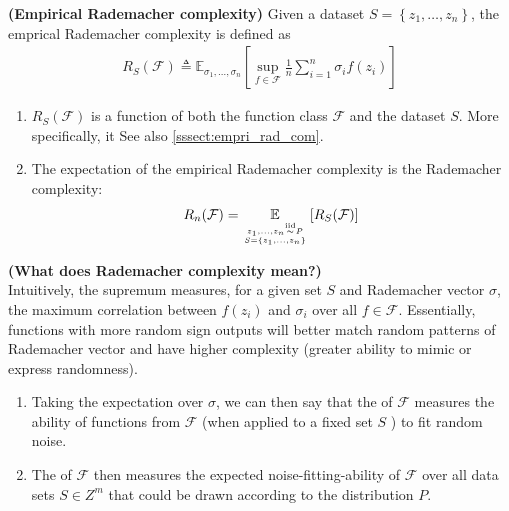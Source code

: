 \documentclass{article}
\newcommand{\bfs}[1]{\textbf{({#1}) }}
\begin{document}
\begin{defa}\bfs{Empirical Rademacher complexity}
 Given a dataset $S=\left\{z_{1}, \ldots, z_{n}\right\}$, the emprical Rademacher complexity is defined as
\begin{align*}
R_{S}(\mathcal{F}) \triangleq \mathbb{E}_{\sigma_{1}, \ldots, \sigma_{n}}\left[\sup _{f \in \mathcal{F}} \frac{1}{n} \sum_{i=1}^{n} \sigma_{i} f\left(z_{i}\right)\right]
\end{align*}
\end{defa}
\begin{rema}\text{ \\}
\begin{enumerate}
    \item $R_{S}(\mathcal{F})$ is a function of both the function class $\mathcal{F}$ and the dataset $S$. More specifically, it   See also \cref{sssect:empri_rad_com}.
    \item The expectation of the empirical Rademacher complexity is the Rademacher complexity:
    $$R_{n}(\mathcal{F})=\underset{z_{1}, \ldots, z_{n} \stackrel{\operatorname{iid}}{\sim} P \atop S=\left\{z_{1}, \ldots, z_{n}\right\}}{\mathbb{E}}\left[R_{S}(\mathcal{F})\right]$$
\end{enumerate}
\end{rema}




\begin{rema}\bfs{What does Rademacher complexity mean?}\\
Intuitively, the supremum measures, for a given set $S$ and Rademacher vector $\sigma$, the maximum correlation between $f\left(z_{i}\right)$ and $\sigma_{i}$ over all $f \in \mathcal{F}$. Essentially, functions with more random sign outputs will better match random patterns of Rademacher vector and have higher complexity (greater ability to mimic or express randomness).
\begin{enumerate}
    \item Taking the expectation over $\sigma$, we can then say that the  of $\mathcal{F}$ measures the ability of functions from $\mathcal{F}$ (when applied to a fixed set $S$ ) to fit random noise.
    \item The  of $\mathcal{F}$ then measures the expected noise-fitting-ability of $\mathcal{F}$ over all data sets $S \in Z^{m}$ that could be drawn according to the distribution $P$.
\end{enumerate}
\end{rema}
\end{document}
